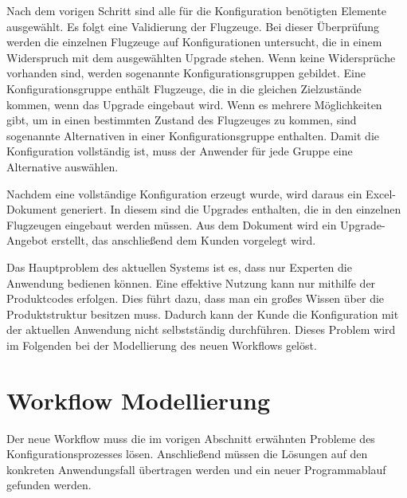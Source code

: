Nach dem vorigen Schritt sind alle für die Konfiguration benötigten Elemente ausgewählt. Es folgt eine Validierung der Flugzeuge. Bei dieser Überprüfung werden die einzelnen Flugzeuge auf Konfigurationen untersucht, die in einem Widerspruch mit dem ausgewählten Upgrade stehen. Wenn keine Widersprüche vorhanden sind, werden sogenannte Konfigurationsgruppen gebildet. Eine Konfigurationsgruppe enthält Flugzeuge, die in die gleichen Zielzustände kommen, wenn das Upgrade eingebaut wird. Wenn es mehrere Möglichkeiten gibt, um in einen bestimmten Zustand des Flugzeuges zu kommen, sind sogenannte Alternativen in einer Konfigurationsgruppe enthalten. Damit die Konfiguration vollständig ist, muss der Anwender für jede Gruppe eine Alternative auswählen. \par

Nachdem eine vollständige Konfiguration erzeugt wurde, wird daraus ein Excel-Dokument generiert. In diesem sind die Upgrades enthalten, die in den einzelnen Flugzeugen eingebaut werden müssen. Aus dem Dokument wird ein Upgrade-Angebot erstellt, das anschließend dem Kunden vorgelegt wird. \par 

Das Hauptproblem des aktuellen Systems ist es, dass nur Experten die Anwendung bedienen können. Eine effektive Nutzung kann nur mithilfe der Produktcodes erfolgen. Dies führt dazu, dass man ein großes Wissen über die Produktstruktur besitzen muss. Dadurch kann der Kunde die Konfiguration mit der aktuellen Anwendung nicht selbstständig durchführen. Dieses Problem wird im Folgenden bei der Modellierung des neuen Workflows gelöst.

\section{Workflow Modellierung}\label{workflow_modelling}
Der neue Workflow muss die im vorigen Abschnitt erwähnten Probleme des Konfigurationsprozesses lösen.  Anschließend müssen die Lösungen auf den konkreten Anwendungsfall übertragen werden und ein neuer Programmablauf gefunden werden.

